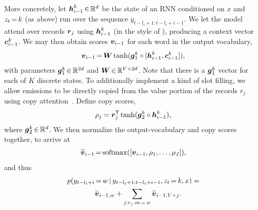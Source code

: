 \documentclass[11pt,a4paper]{article}
\begin{document}
More concretely, let $\boldsymbol{h}^k_{i-1} \, {\in} \, \mathbb{R}^d$ be the state of an RNN conditioned on $x$ and $z_t \, {=} \, k$ (as above) run over the sequence $y_{t-l_t+1:t-l_t+i-1}$. 
We let the model attend over records $\boldsymbol{r}_j$ using $\boldsymbol{h}^k_{i-1}$ (in the style of \citet{luong2015effective}), 
producing a context vector $\boldsymbol{c}^k_{i-1}$.  We may then obtain scores $\boldsymbol{v}_{i-1}$ for each word in the output vocabulary, 
\begin{align*}
\boldsymbol{v}_{i-1} \, {=} \, \boldsymbol{W} \tanh(\boldsymbol{g}_1^k \circ [\boldsymbol{h}^k_{i-1}, \boldsymbol{c}^k_{i-1}]) ,
\end{align*}
with parameters $\boldsymbol{g}_1^k \, {\in} \, \mathbb{R}^{2d}$ and $\boldsymbol{W} \, {\in} \, \mathbb{R}^{V \times 2d}$. Note that there is a $\boldsymbol{g}_1^k$ vector for each of $K$ discrete states. To additionally implement a kind of slot filling, we allow  emissions to be directly copied from the value portion of the records $r_j$ using copy attention~\citep{gulcehre2016pointing,gu2016incorporating,yang2016reference}. Define copy scores,
\begin{align*}
    \rho_j = \boldsymbol{r}_j^{\mathsf{T}} \tanh(\boldsymbol{g}_2^k \circ \boldsymbol{h}^k_{i-1}),
\end{align*}
where $\boldsymbol{g}_2^k \, {\in} \, \mathbb{R}^{d}$. 
We then normalize the output-vocabulary and copy scores together, to arrive at
\begin{align*}
    \widetilde{\boldsymbol{v}}_{i-1} \, {=} \, \mathrm{softmax}([\boldsymbol{v}_{i-1}, \rho_1, \ldots, \rho_J]),
\end{align*}
and thus
\begin{align*}
    p(y_{t-l_t+i} &\, {=} \, w \,|\, y_{t-l_t+1:t-l_t+i-1}, z_t \, {=} \, k, x) = \\
    &\widetilde{\boldsymbol{v}}_{i-1, w} + \sum_{j: r_j.m \, {=} \, w} \widetilde{\boldsymbol{v}}_{i-1, V+j}.
\end{align*}

\vspace{-0.15cm}
\end{document}

